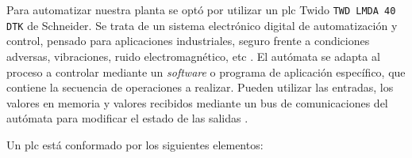 Para automatizar nuestra planta se optó por utilizar un \gls{plc} Twido
\verb|TWD LMDA 40 DTK| de Schneider.
Se trata de un sistema electrónico digital de automatización y control, pensado
para aplicaciones industriales, seguro frente a condiciones adversas,
vibraciones, ruido electromagnético, etc \cite{bib:ApuntesJGabriel}.
El autómata se adapta al proceso a controlar mediante un
\textit{software} o programa de aplicación específico, que contiene la secuencia
de operaciones a realizar.
Pueden utilizar las entradas, los valores en memoria y valores
recibidos mediante un bus de comunicaciones del autómata para modificar el
estado de las salidas \cite{bib:libroAutomat1}.

Un \gls{plc} está conformado por los siguientes elementos:
